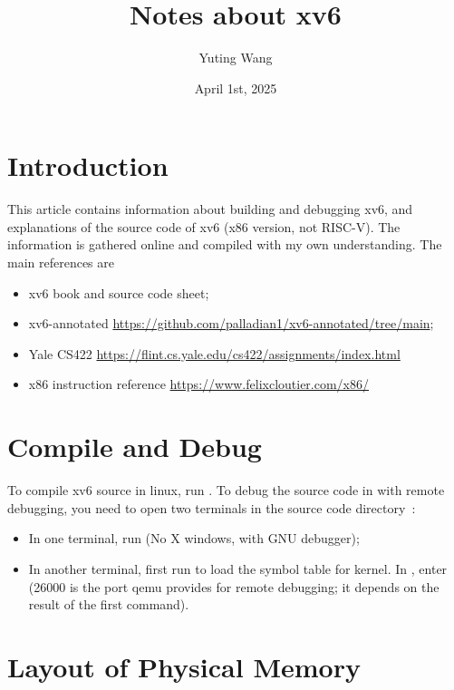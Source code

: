 \documentclass{article}
\title{Notes about xv6}
\author{Yuting Wang}
\date{April 1st, 2025}
\begin{document}
\maketitle

\section{Introduction}

This article contains information about building and debugging xv6,
and explanations of the source code of xv6 (x86 version, not
RISC-V). The information is gathered online and compiled with my own
understanding. The main references are

\begin{itemize}
\item xv6 book and source code sheet;
\item xv6-annotated \url{https://github.com/palladian1/xv6-annotated/tree/main};
\item Yale CS422 \url{https://flint.cs.yale.edu/cs422/assignments/index.html}
\item x86 instruction reference \url{https://www.felixcloutier.com/x86/}
\end{itemize}

\section{Compile and Debug}

To compile xv6 source in linux, run . To debug the source
code in  with remote debugging, you need to open two
terminals in the source code directory~\cite{xv6-debug}:

\begin{itemize}
\item In one terminal, run  (No X windows,
  with GNU debugger);

\item In another terminal, first run  to load the
  symbol table for kernel. In , enter  (26000 is the port qemu provides for remote
  debugging; it depends on the result of the first command).
\end{itemize}

\section{Layout of Physical Memory}
\end{document}
